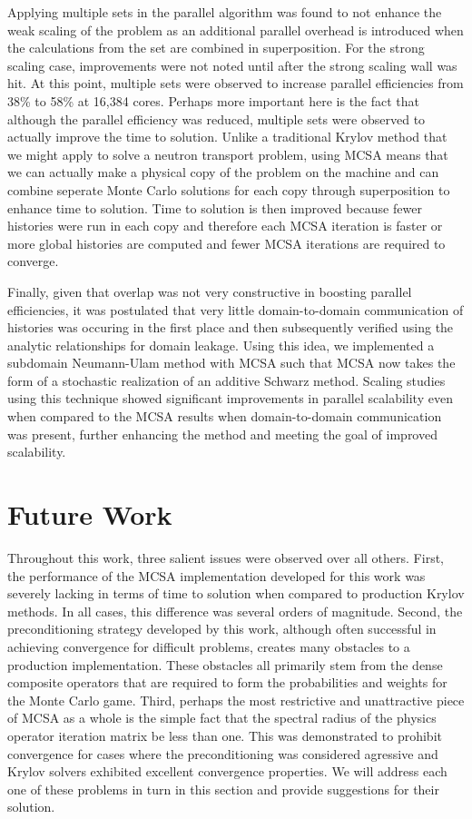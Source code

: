 Applying multiple sets in the parallel algorithm was found to not
enhance the weak scaling of the problem as an additional parallel
overhead is introduced when the calculations from the set are combined
in superposition. For the strong scaling case, improvements were not
noted until after the strong scaling wall was hit. At this point,
multiple sets were observed to increase parallel efficiencies from
38\% to 58\% at 16,384 cores. Perhaps more important here is the fact
that although the parallel efficiency was reduced, multiple sets were
observed to actually improve the time to solution. Unlike a
traditional Krylov method that we might apply to solve a neutron
transport problem, using MCSA means that we can actually make a
physical copy of the problem on the machine and can combine seperate
Monte Carlo solutions for each copy through superposition to enhance
time to solution. Time to solution is then improved because fewer
histories were run in each copy and therefore each MCSA iteration is
faster or more global histories are computed and fewer MCSA iterations
are required to converge.

Finally, given that overlap was not very constructive in boosting
parallel efficiencies, it was postulated that very little
domain-to-domain communication of histories was occuring in the first
place and then subsequently verified using the analytic relationships
for domain leakage. Using this idea, we implemented a subdomain
Neumann-Ulam method with MCSA such that MCSA now takes the form of a
stochastic realization of an additive Schwarz method. Scaling studies
using this technique showed significant improvements in parallel
scalability even when compared to the MCSA results when
domain-to-domain communication was present, further enhancing the
method and meeting the goal of improved scalability.

\section{Future Work\ }
\label{sec:future_work}

Throughout this work, three salient issues were observed over all
others. First, the performance of the MCSA implementation developed
for this work was severely lacking in terms of time to solution when
compared to production Krylov methods. In all cases, this difference
was several orders of magnitude. Second, the preconditioning strategy
developed by this work, although often successful in achieving
convergence for difficult problems, creates many obstacles to a
production implementation. These obstacles all primarily stem from the
dense composite operators that are required to form the probabilities
and weights for the Monte Carlo game. Third, perhaps the most
restrictive and unattractive piece of MCSA as a whole is the simple
fact that the spectral radius of the physics operator iteration matrix
be less than one. This was demonstrated to prohibit convergence for
cases where the preconditioning was considered agressive and Krylov
solvers exhibited excellent convergence properties. We will address
each one of these problems in turn in this section and provide
suggestions for their solution.

